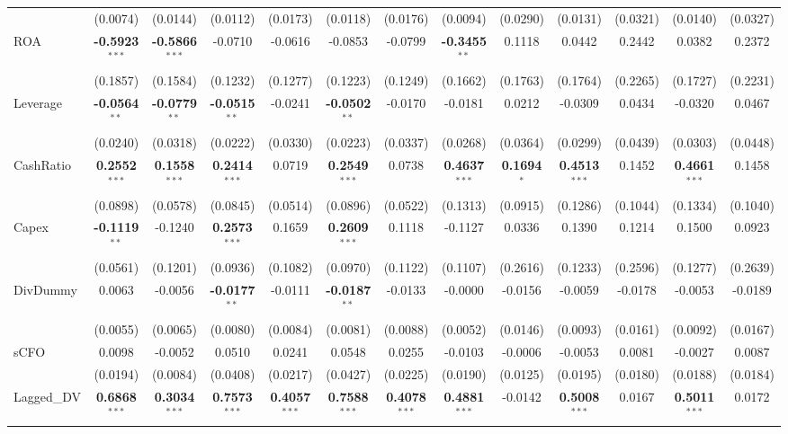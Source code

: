 \begin{landscape}
\begin{table}[H]
\begin{tabular}{lcccccccccccc}
 & (0.0074) & (0.0144) & (0.0112) & (0.0173) & (0.0118) & (0.0176) & (0.0094) & (0.0290) & (0.0131) & (0.0321) & (0.0140) & (0.0327) \\
ROA & \textbf{-0.5923}$^{***}$ & \textbf{-0.5866}$^{***}$ & -0.0710 & -0.0616 & -0.0853 & -0.0799 & \textbf{-0.3455}$^{**}$ & 0.1118 & 0.0442 & 0.2442 & 0.0382 & 0.2372 \\
 & (0.1857) & (0.1584) & (0.1232) & (0.1277) & (0.1223) & (0.1249) & (0.1662) & (0.1763) & (0.1764) & (0.2265) & (0.1727) & (0.2231) \\
Leverage & \textbf{-0.0564}$^{**}$ & \textbf{-0.0779}$^{**}$ & \textbf{-0.0515}$^{**}$ & -0.0241 & \textbf{-0.0502}$^{**}$ & -0.0170 & -0.0181 & 0.0212 & -0.0309 & 0.0434 & -0.0320 & 0.0467 \\
 & (0.0240) & (0.0318) & (0.0222) & (0.0330) & (0.0223) & (0.0337) & (0.0268) & (0.0364) & (0.0299) & (0.0439) & (0.0303) & (0.0448) \\
CashRatio & \textbf{0.2552}$^{***}$ & \textbf{0.1558}$^{***}$ & \textbf{0.2414}$^{***}$ & 0.0719 & \textbf{0.2549}$^{***}$ & 0.0738 & \textbf{0.4637}$^{***}$ & \textbf{0.1694}$^{*}$ & \textbf{0.4513}$^{***}$ & 0.1452 & \textbf{0.4661}$^{***}$ & 0.1458 \\
 & (0.0898) & (0.0578) & (0.0845) & (0.0514) & (0.0896) & (0.0522) & (0.1313) & (0.0915) & (0.1286) & (0.1044) & (0.1334) & (0.1040) \\
Capex & \textbf{-0.1119}$^{**}$ & -0.1240 & \textbf{0.2573}$^{***}$ & 0.1659 & \textbf{0.2609}$^{***}$ & 0.1118 & -0.1127 & 0.0336 & 0.1390 & 0.1214 & 0.1500 & 0.0923 \\
 & (0.0561) & (0.1201) & (0.0936) & (0.1082) & (0.0970) & (0.1122) & (0.1107) & (0.2616) & (0.1233) & (0.2596) & (0.1277) & (0.2639) \\
DivDummy & 0.0063 & -0.0056 & \textbf{-0.0177}$^{**}$ & -0.0111 & \textbf{-0.0187}$^{**}$ & -0.0133 & -0.0000 & -0.0156 & -0.0059 & -0.0178 & -0.0053 & -0.0189 \\
 & (0.0055) & (0.0065) & (0.0080) & (0.0084) & (0.0081) & (0.0088) & (0.0052) & (0.0146) & (0.0093) & (0.0161) & (0.0092) & (0.0167) \\
sCFO & 0.0098 & -0.0052 & 0.0510 & 0.0241 & 0.0548 & 0.0255 & -0.0103 & -0.0006 & -0.0053 & 0.0081 & -0.0027 & 0.0087 \\
 & (0.0194) & (0.0084) & (0.0408) & (0.0217) & (0.0427) & (0.0225) & (0.0190) & (0.0125) & (0.0195) & (0.0180) & (0.0188) & (0.0184) \\
Lagged\_DV & \textbf{0.6868}$^{***}$ & \textbf{0.3034}$^{***}$ & \textbf{0.7573}$^{***}$ & \textbf{0.4057}$^{***}$ & \textbf{0.7588}$^{***}$ & \textbf{0.4078}$^{***}$ & \textbf{0.4881}$^{***}$ & -0.0142 & \textbf{0.5008}$^{***}$ & 0.0167 & \textbf{0.5011}$^{***}$ & 0.0172 \\

\end{tabular}
\end{table}
\end{landscape}
